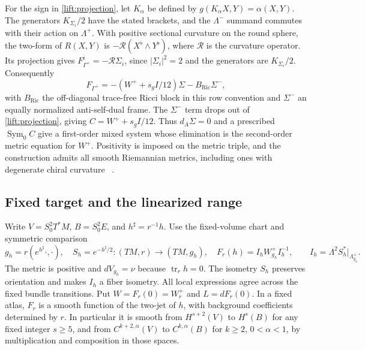 \documentclass[11pt]{article}
\numberwithin{equation}{section}
\theoremstyle{definition}
\theoremstyle{remark}
\begin{document}
For the sign in \eqref{lift:projection}, let \(K_\alpha\) be defined by
\(g(K_\alpha X,Y)=\alpha(X,Y)\). The generators
\(K_{\Sigma_i}/2\) have the stated brackets, and the \(\Lambda^-\)
summand commutes with their action on \(\Lambda^+\). With positive
sectional curvature on the round sphere, the two-form of \(R(X,Y)\)
is \(-\mathcal R(X^\flat\wedge Y^\flat)\), where \(\mathcal R\) is the
curvature operator. Its projection gives
\(F_{\Gamma^+}^i=-\mathcal R\Sigma_i\), since \(|\Sigma_i|^2=2\)
and the generators are \(K_{\Sigma_i}/2\). Consequently
\[
 F_{\Gamma^+}=-(W^++s_g I/12)\Sigma-B_{\mathrm{Ric}}\Sigma^- ,
\]
with \(B_{\mathrm{Ric}}\) the off-diagonal trace-free Ricci block
in this row convention and \(\Sigma^-\) an equally normalized
anti-self-dual frame. The \(\Sigma^-\) term drops out of
\eqref{lift:projection}, giving \(C=W^++s_g I/12\).
Thus \(d_A\Sigma=0\) and a prescribed \(\operatorname{Sym}_0 C\)
give a first-order mixed system whose elimination is the second-order
metric equation for \(W^+\). Positivity is imposed on the metric
triple, and the construction admits all smooth Riemannian metrics,
including ones with degenerate chiral curvature~\cite[Section~1]{GoverGursky2024}
\cite[chiral curvature decomposition]{Baker2026ChiralMetricEvolution}.

\subsection{Fixed target and the linearized range}

Write \(V=S^2_0T^*M\), \(B=S^2_0E\), and \(h^\sharp=r^{-1}h\).
Use the fixed-volume chart and symmetric comparison
\begin{equation}\label{lift:chart}
 g_h=r(e^{h^\sharp}\cdot,\cdot),\quad
 S_h=e^{-h^\sharp/2}:(TM,r)\longrightarrow(TM,g_h),\quad
 F_r(h)=I_hW^+_{g_h}I_h^{-1},\qquad
 I_h=\Lambda^2S_h^*\big|_{\Lambda_{g_h}^+}.
\end{equation}
The metric is positive and \(dV_{g_h}=\nu\) because
\(\operatorname{tr}_r h=0\).
The isometry \(S_h\) preserves orientation and makes \(I_h\) a fiber
isometry. All local expressions agree across the fixed bundle
transitions. Put \(W=F_r(0)=W_r^+\) and \(L=dF_r(0)\). In a fixed atlas,
\(F_r\) is a smooth function of the two-jet of \(h\), with background
coefficients determined by \(r\). In particular it is smooth from
\(H^{s+2}(V)\) to \(H^s(B)\) for any fixed integer \(s\ge5\), and from
\(C^{k+2,\alpha}(V)\) to \(C^{k,\alpha}(B)\) for \(k\ge2\),
\(0<\alpha<1\), by multiplication and composition in those spaces.
\end{document}
